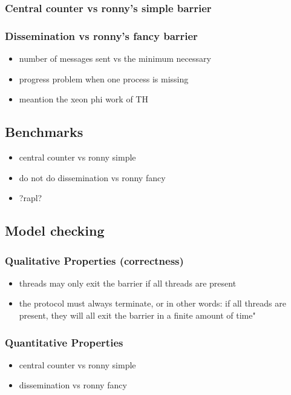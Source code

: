 \documentclass[a4paper, 10pt]{article}
\begin{document}
\subsubsection{Central counter vs ronny's simple barrier}
\subsubsection{Dissemination vs ronny's fancy barrier}
\begin{itemize}
	\item number of messages sent vs the minimum necessary
	\item progress problem when one process is missing
	\item meantion the xeon phi work of TH
\end{itemize}

\subsection{Benchmarks}
\begin{itemize}
	\item central counter vs ronny simple
	\item do not do dissemination vs ronny fancy
	\item ?rapl?
\end{itemize}

\subsection{Model checking}
\subsubsection{Qualitative Properties (correctness)}
\begin{itemize}
	\item threads may only exit the barrier if all threads are present
	\item the protocol must always terminate, or in other words: if all threads are present, they will all exit the barrier in a finite amount of time"
\end{itemize}
\subsubsection{Quantitative Properties}
\begin{itemize}
	\item central counter vs ronny simple
	\item dissemination vs ronny fancy
\end{itemize}
\end{document}
